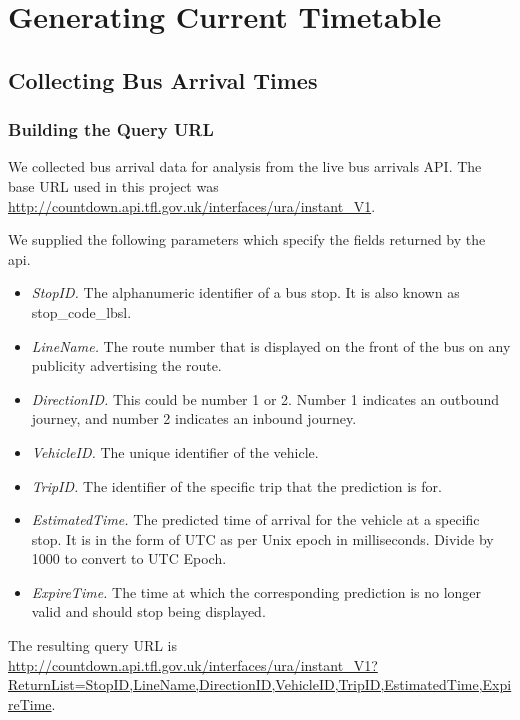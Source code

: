 \section{Generating Current Timetable}
\label{sec:current_timetable_generation}

\subsection{Collecting Bus Arrival Times}
\label{sec:collecting_arrival_times}

\subsubsection{Building the Query URL}
\par We collected bus arrival data for analysis from the live bus arrivals API. The base URL used in this project was \url{http://countdown.api.tfl.gov.uk/interfaces/ura/instant_V1}.

\par We supplied the following parameters which specify the fields returned by the \acrshort{api}.

\begin{itemize}
  \item \textit{StopID.} The alphanumeric identifier of a bus stop. It is also known as stop\_code\_lbsl.
  \item \textit{LineName.} The route number that is displayed on the front of the bus on any publicity advertising the route.
  \item \textit{DirectionID.} This could be number 1 or 2. Number 1 indicates an outbound journey, and number 2 indicates an inbound journey.
  \item \textit{VehicleID.} The unique identifier of the vehicle.
  \item \textit{TripID.} The identifier of the specific trip that the prediction is for.
  \item \textit{EstimatedTime.} The predicted time of arrival for the vehicle at a specific stop. It is in the form of UTC as per Unix epoch in milliseconds. Divide by 1000 to convert to UTC Epoch.
  \item \textit{ExpireTime.} The time at which the corresponding prediction is no longer valid and should stop being displayed.
\end{itemize}

\par The resulting query URL is \sloppy \url{http://countdown.api.tfl.gov.uk/interfaces/ura/instant_V1?ReturnList=StopID,LineName,DirectionID,VehicleID,TripID,EstimatedTime,ExpireTime}.

